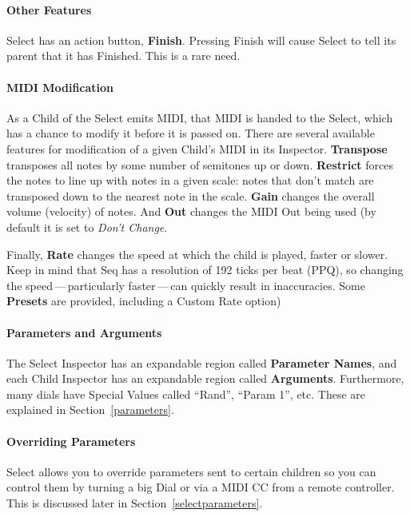 \documentclass[twoside,10pt]{article}
\begin{document}
\paragraph{Other Features}

Select has an action button, {\bf Finish}.  Pressing Finish will cause Select to tell its parent that it has Finished.  This is a rare need.


\paragraph{MIDI Modification}

As a Child of the Select emits MIDI, that MIDI is handed to the Select, which has a chance to modify it before it is passed on.  There are several available features for modification of a given Child's MIDI in its Inspector.  {\bf Transpose} transposes all notes by some number of semitones up or down.  {\bf Restrict} forces the notes to line up with notes in a given scale: notes that don't match are transposed down to the nearest note in the scale.  {\bf Gain} changes the overall volume (velocity) of notes.  And {\bf Out} changes the MIDI Out being used (by default it is set to {\it Don't Change}.

Finally, {\bf Rate} changes the speed at which the child is played, faster or slower.  Keep in mind that Seq has a resolution of 192 ticks per beat (PPQ), so changing the speed\,---\,particularly faster\,---\,can quickly result in inaccuracies.    Some {\bf Presets} are provided, including a Custom Rate option)


\paragraph{Parameters and Arguments}

The Select Inspector has an expandable region called {\bf Parameter Names}, and each Child Inspector has an expandable region called {\bf Arguments}. Furthermore, many dials have Special Values called ``Rand'', ``Param 1'', etc.  These are explained in Section~\ref{parameters}.

\paragraph{Overriding Parameters}
Select allows you to override parameters sent to certain children so you can control them by turning a big Dial or via a MIDI CC from a remote controller.  This is discussed later in Section~\ref{selectparameters}.
\end{document}
